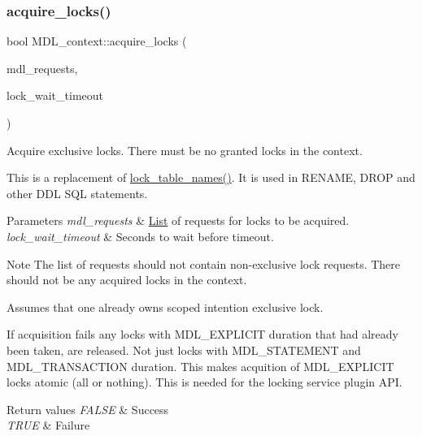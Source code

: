 \subsubsection{\texorpdfstring{acquire\+\_\+locks()}{acquire\_locks()}}
{\footnotesize\ttfamily bool M\+D\+L\+\_\+context\+::acquire\+\_\+locks (\begin{DoxyParamCaption}\item[{\mbox{\hyperlink{classI__P__List}{M\+D\+L\+\_\+request\+\_\+list}} $\ast$}]{mdl\+\_\+requests,  }\item[{ulong}]{lock\+\_\+wait\+\_\+timeout }\end{DoxyParamCaption})}

Acquire exclusive locks. There must be no granted locks in the context.

This is a replacement of \mbox{\hyperlink{group__Data__Dictionary_gae06de7ce22001b035ca61edf2a3dea09}{lock\+\_\+table\+\_\+names()}}. It is used in R\+E\+N\+A\+ME, D\+R\+OP and other D\+DL S\+QL statements.


\begin{DoxyParams}{Parameters}
{\em mdl\+\_\+requests} & \mbox{\hyperlink{classList}{List}} of requests for locks to be acquired.\\
\hline
{\em lock\+\_\+wait\+\_\+timeout} & Seconds to wait before timeout.\\
\hline
\end{DoxyParams}
\begin{DoxyNote}{Note}
The list of requests should not contain non-\/exclusive lock requests. There should not be any acquired locks in the context.

Assumes that one already owns scoped intention exclusive lock.

If acquisition fails any locks with M\+D\+L\+\_\+\+E\+X\+P\+L\+I\+C\+IT duration that had already been taken, are released. Not just locks with M\+D\+L\+\_\+\+S\+T\+A\+T\+E\+M\+E\+NT and M\+D\+L\+\_\+\+T\+R\+A\+N\+S\+A\+C\+T\+I\+ON duration. This makes acquition of M\+D\+L\+\_\+\+E\+X\+P\+L\+I\+C\+IT locks atomic (all or nothing). This is needed for the locking service plugin A\+PI.
\end{DoxyNote}

\begin{DoxyRetVals}{Return values}
{\em F\+A\+L\+SE} & Success \\
\hline
{\em T\+R\+UE} & Failure \\
\hline
\end{DoxyRetVals}
\mbox{\label{classMDL__context_a74ed5299b1da65397a7e6972425b5f2d}} 
